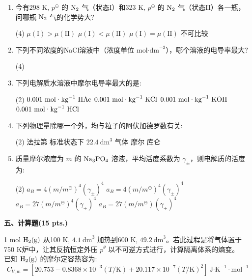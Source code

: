 \begin{enumerate}[label=\arabic*., itemsep=1.5ex]
    \item 今有298 K, $p^\ominus$ 的 $\ce{N2}$ 气（状态I）和323 K, $p^\ominus$ 的 $\ce{N2}$ 气（状态II）各一瓶，问哪瓶 $\ce{N2}$ 气的化学势大?
    \begin{tasks}(4)
        \task $\mu(\text{I}) > \mu(\text{II})$
        \task $\mu(\text{I}) < \mu(\text{II})$
        \task $\mu(\text{I}) = \mu(\text{II})$
        \task 不可比较
    \end{tasks}

    \item 下列不同浓度的NaCl溶液中（浓度单位 $\text{mol·dm}^{-3}$），哪个溶液的电导率最大?
    \begin{tasks}(4)
    \end{tasks}

    \item 下列电解质水溶液中摩尔电导率最大的是:
    \begin{tasks}(2)
        \task $0.001\ \text{mol·kg}^{-1}\ \ce{HAc}$
        \task $0.001\ \text{mol·kg}^{-1}\ \ce{KCl}$
        \task $0.001\ \text{mol·kg}^{-1}\ \ce{KOH}$
        \task $0.001\ \text{mol·kg}^{-1}\ \ce{HCl}$
    \end{tasks}

    \item 下列物理量除哪一个外，均与粒子的阿伏加德罗数有关:
    \begin{tasks}(2)
        \task 法拉第
        \task 标准状态下 $22.4\ \text{dm}^3$ 气体
        \task 摩尔
        \task 库仑
    \end{tasks}

    \item 质量摩尔浓度为 $m$ 的 $\ce{Na3PO4}$ 溶液，平均活度系数为 $\gamma_\pm$，则电解质的活度为:
    \begin{tasks}(2)
        \task $a_B = 4(m/m^\ominus)^4(\gamma_\pm)^4$
        \task $a_B = 4(m/m^\ominus)^4(\gamma_\pm)^4$
        \task $a_B = 27(m/m^\ominus)^4(\gamma_\pm)^4$
        \task $a_B = 27(m/m^\ominus)(\gamma_\pm)^4$
    \end{tasks}
\end{enumerate}

\vspace{0.5cm}
\noindent\textbf{五、计算题(15 pts.)}

1 mol $\ce{H2(g)}$ 从100 K, $4.1\ \text{dm}^3$ 加热到600 K, $49.2\ \text{dm}^3$。若此过程是将气体置于750 K炉中，让其反抗恒定外压 $p^\theta$ 以不可逆方式进行，计算隔离体系的熵变。
\\
已知 $\ce{H2(g)}$ 的摩尔定容热容为:
\[
C_{V,\text{m}} = [20.753 - 0.8368\times10^{-3}(T/\text{K}) + 20.117\times10^{-7}(T/\text{K})^2]\ \text{J·K}^{-1}·\text{mol}^{-1}
\]

